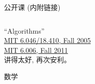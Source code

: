 \begin{frame}{}
  \centerline{\Huge 公开课 {\small (内附链接)}}
\end{frame}

\begin{frame}{}
  \begin{columns}
  \end{columns}

  \begin{center}
    ``Algorithms''\\[4pt]
    \href{http://open.163.com/special/opencourse/algorithms.html}{MIT 6.046/18.410, Fall 2005}\\[3pt]
    \href{https://ocw.mit.edu/courses/electrical-engineering-and-computer-science/6-006-introduction-to-algorithms-fall-2011/lecture-videos/}{MIT 6.006, Fall 2011}\\[10pt]

    讲得太好, 再次安利。
  \end{center}
\end{frame}

\begin{frame}{数学}
  \begin{columns}
  \end{columns}
\end{frame}
